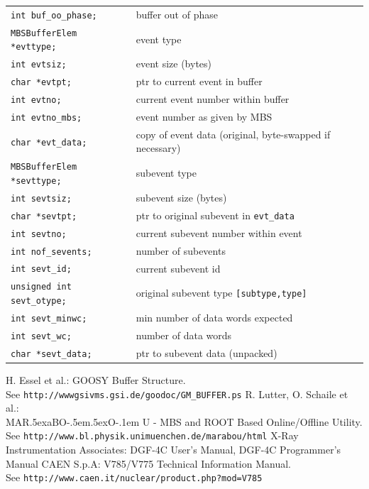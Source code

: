 \documentclass[10pt,a4paper]{article}
\def\MARaBOU{MAR\lower.5ex\hbox{a}BO\kern-.5em\lower.5ex\hbox{O}\kern-.1em U}%
\begin{document}
\begin{center}
\begin{tabular}{ll}
	\verb+int buf_oo_phase;+			&		buffer out of phase \\
	\verb+MBSBufferElem *evttype;+			&		event type	\\
	\verb+int evtsiz;+				&		event size (bytes)	\\
	\verb+char *evtpt;+ 				&		ptr to current event in buffer	\\
	\verb+int evtno;+				&		current event number within buffer	\\
	\verb+int evtno_mbs;+				&		event number as given by MBS	\\
	\verb+char *evt_data;+				&		copy of event data (original, byte-swapped if necessary)	\\
	\verb+MBSBufferElem *sevttype;+ 		&		subevent type	\\
	\verb+int sevtsiz;+ 				&		subevent size (bytes)	\\
	\verb+char *sevtpt;+				&		ptr to original subevent in \verb+evt_data+	\\
	\verb+int sevtno;+				&		current subevent number within event	\\
	\verb+int nof_sevents;+ 			&		number of subevents	\\
	\verb+int sevt_id;+ 				&	        current subevent id \\
	\verb+unsigned int sevt_otype;+ 		&		original subevent type \verb+[subtype,type]+	\\
	\verb+int sevt_minwc;+				&		min number of data words expected \\
	\verb+int sevt_wc;+ 				&		number of data words \\
	\verb+char *sevt_data;+ 			&		ptr to subevent data (unpacked)
\end{tabular}
\end{center}

\newpage
\begin{thebibliography}{9}
 H. Essel et al.: GOOSY Buffer Structure.\\
See \texttt{http://www\-gsi\-vms.gsi.de/goodoc/GM\_BUFFER.ps}
 R. Lutter, O. Schaile et al.:\\
\MARaBOU{} - MBS and ROOT Based Online/Offline Utility.\\
See \texttt{http://www.bl.physik.uni\-muenchen.de/marabou/html}
 X-Ray Instrumentation Associates:
DGF-4C User's Manual, DGF-4C Programmer's Manual
 CAEN S.p.A: V785/V775 Technical Information Manual.\\
See \texttt{http://www.caen.it/nuclear/product.php?mod=V785}
\end{thebibliography}
\end{document}
